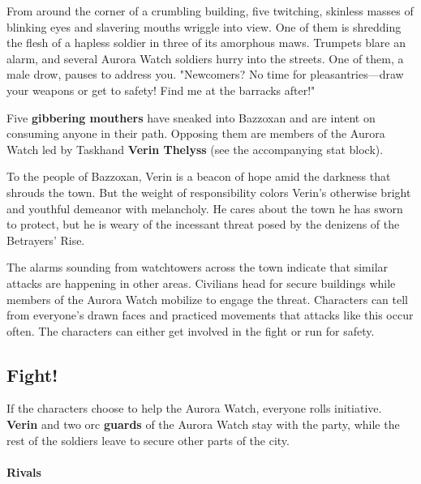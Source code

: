 \documentclass[a4paper, 11pt, bg=full, twocolumn, nooutline]{dndbook}
\begin{document}
\begin{DndReadAloud}
From around the corner of a crumbling building, five twitching, skinless masses of blinking eyes and slavering mouths wriggle into view. One of them is shredding the flesh of a hapless soldier in three of its amorphous maws. Trumpets blare an alarm, and several Aurora Watch soldiers hurry into the streets. One of them, a male drow, pauses to address you. "Newcomers? No time for pleasantries---draw your weapons or get to safety! Find me at the barracks after!"
\end{DndReadAloud}


Five \textbf{gibbering mouthers} have sneaked into Bazzoxan and are intent on consuming anyone in their path. Opposing them are members of the Aurora Watch led by Taskhand \textbf{Verin Thelyss} (see the accompanying stat block).

To the people of Bazzoxan, Verin is a beacon of hope amid the darkness that shrouds the town. But the weight of responsibility colors Verin's otherwise bright and youthful demeanor with melancholy. He cares about the town he has sworn to protect, but he is weary of the incessant threat posed by the denizens of the Betrayers' Rise.

The alarms sounding from watchtowers across the town indicate that similar attacks are happening in other areas. Civilians head for secure buildings while members of the Aurora Watch mobilize to engage the threat. Characters can tell from everyone's drawn faces and practiced movements that attacks like this occur often. The characters can either get involved in the fight or run for safety.


\subsection{Fight!}

If the characters choose to help the Aurora Watch, everyone rolls initiative. \textbf{Verin} and two orc \textbf{guards} of the Aurora Watch stay with the party, while the rest of the soldiers leave to secure other parts of the city.

\paragraph{Rivals}
\end{document}
